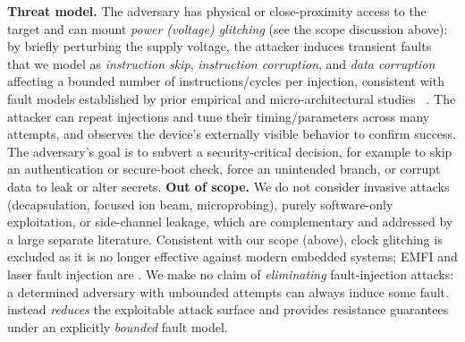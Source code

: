 \noindent\textbf{Threat model.}
The adversary has physical or close-proximity access to the target and can mount \emph{power (voltage) glitching} (see the scope discussion above): by briefly perturbing the supply voltage, the attacker induces transient faults that we model as \emph{instruction skip}, \emph{instruction corruption}, and \emph{data corruption} affecting a bounded number of instructions/cycles per injection, consistent with fault models established by prior empirical and micro-architectural studies~\cite{moro2013electromagnetic, dutertre2021experimental, trouchkine2021electromagnetic, alshaer2024cross} .
The attacker can repeat injections and tune their timing/parameters across many attempts, and observes the device's externally visible behavior to confirm success.
The adversary's goal is to subvert a security-critical decision, for example to skip an authentication or secure-boot check, force an unintended branch, or corrupt data to leak or alter secrets.
\noindent\textbf{Out of scope.}
We do not consider invasive attacks (decapsulation, focused ion beam, microprobing), purely software-only exploitation, or side-channel leakage, which are complementary and addressed by a large separate literature.
Consistent with our scope (above), clock glitching is excluded as it is no longer effective against modern embedded systems; EMFI and laser fault injection are .
We make no claim of \emph{eliminating} fault-injection attacks: a determined adversary with unbounded attempts can always induce some fault. \sysname instead \emph{reduces} the exploitable attack surface and provides resistance guarantees under an explicitly \emph{bounded} fault model.
